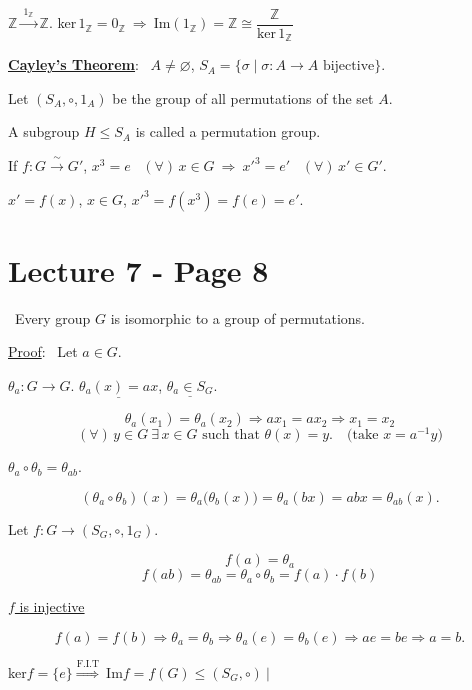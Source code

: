 \bigskip
\noindent $\mathbb{Z} \xrightarrow{\ 1_{\mathbb{Z}}\ } \mathbb{Z}$. \quad ker$\,1_\mathbb{Z} = 0_\mathbb{Z} \ \Rightarrow \ \text{Im}(1_\mathbb{Z}) = \mathbb{Z} \cong \dfrac{\mathbb{Z}}{\text{ker}\,1_\mathbb{Z}}$

\bigskip
\noindent\underline{\textbf{Cayley's Theorem}}: \ $A\neq\varnothing$, $S_A = \{\sigma \mid \sigma:A\to A \text{ bijective}\}$.

\bigskip
\noindent Let $(S_A,\circ,1_A)$ be the group of all permutations of the set $A$.

\noindent A subgroup $H\leq S_A$ is called a permutation group.

\bigskip
\noindent If $f:G\xrightarrow{\ \sim\ }G'$, \quad $x^3=e$ \ $(\forall)\,x\in G \ \Rightarrow \ x'^3=e'$ \ $(\forall)\,x'\in G'$.

\noindent $x'=f(x)$, $x\in G$, \quad $x'^3 = f(x^3) = f(e) = e'$.



\section*{Lecture 7 - Page 8}

\noindent{} \ Every group $G$ is isomorphic to a group of permutations.

\bigskip
\noindent\underline{Proof}: \ Let $a\in G$.

\noindent $\theta_a: G\to G$. \quad $\underline{\theta_a(x)=ax}$, \quad $\underline{\theta_a\in S_G}$.

\[
\theta_a(x_1)=\theta_a(x_2) \Rightarrow ax_1=ax_2 \Rightarrow x_1=x_2
\]
\[
(\forall)\,y\in G \ \exists\,x\in G \text{ such that } \theta(x)=y. \quad \text{(take } x=a^{-1}y\text{)}
\]

\bigskip
\noindent\underline{$\theta_a\circ\theta_b = \theta_{ab}$}.

\[
(\theta_a\circ\theta_b)(x) = \theta_a\big(\theta_b(x)\big) = \theta_a(bx) = abx = \theta_{ab}(x).
\]

\bigskip
\noindent Let $f: G \to (S_G,\circ,1_G)$.

\[
f(a) = \theta_a
\]
\[
f(ab) = \theta_{ab} = \theta_a\circ\theta_b = f(a)\cdot f(b)
\]

\bigskip
\noindent\underline{$f$ is injective}

\[
f(a)=f(b) \Rightarrow \theta_a=\theta_b \Rightarrow \theta_a(e)=\theta_b(e) \Rightarrow ae=be \Rightarrow a=b.
\]

\bigskip
\noindent ker$f=\{e\} \overset{\text{F.I.T}}{\Longrightarrow} \ \text{Im}f = f(G) \leq (S_G,\circ) \ \Big|$

